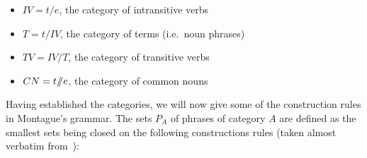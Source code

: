\begin{itemize}
\item $IV = t / e$, the category of intransitive verbs
\item $T = t / IV$, the category of terms (i.e.\ noun phrases)
\item $TV = IV / T$, the category of transitive verbs
\item $CN = t /\!\!/ e$, the category of common nouns
\end{itemize}

Having established the categories, we will now give some of the
construction rules in Montague's grammar. The sets $P_A$ of phrases of
category $A$ are defined as the smallest sets being closed on the following
constructions rules (taken almost verbatim from~\cite{montague1973proper}):

